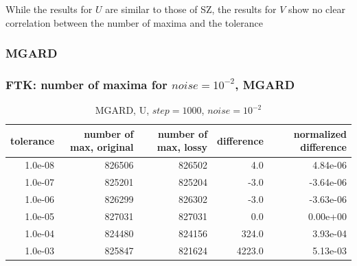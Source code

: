 \begin{frame}[fragile]
  {\tiny
    While the results for $U$ are similar to those of SZ, the results for $V$ show no clear correlation between the number of maxima and the tolerance
  }
\end{frame}



\subsubsection{MGARD}
\begin{frame}[fragile]
  \frametitle{FTK: number of maxima for $noise = 10^{-2}$, MGARD }

  {\tiny
\begin{table}[H]
\centering
\begin{tabular}{|r|r|r|r|r|}
\hline
tolerance &         number of max, original &         number of max, lossy &       difference & normalized difference \\
\hline

  1.0e-08 &           826506 &        826502 &             4.0 &       4.84e-06 \\
\hline
  1.0e-07 &           825201 &        825204 &            -3.0 &      -3.64e-06 \\
\hline
  1.0e-06 &           826299 &        826302 &            -3.0 &      -3.63e-06 \\
\hline
  1.0e-05 &           827031 &        827031 &             0.0 &       0.00e+00 \\
\hline
  1.0e-04 &           824480 &        824156 &           324.0 &       3.93e-04 \\
\hline
  1.0e-03 &           825847 &        821624 &          4223.0 &       5.13e-03 \\
\hline
\end{tabular}
\caption{MGARD, U, $step = 1000$, $noise = 10^{-2}$}
\label{mgard_u_table}
\end{table}

  }


\end{frame}
